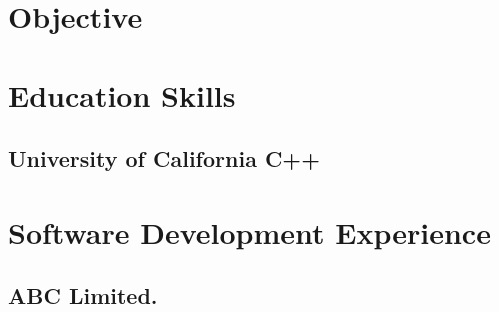 \documentclass{cv}
\begin{document}






\section{Objective}


\section{Education      \hfill{Skills}}
\subsection{University of California \hfill{C++}}


\section{Software Development Experience}
\subsection{ABC Limited.}


\end{document}
